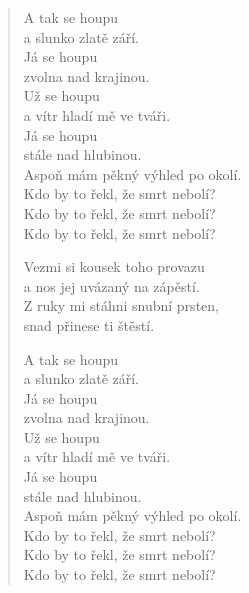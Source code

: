 \begin{multicols}{3}
\begin{verse}
A tak se houpu\\
a slunko zlatě září.\\
Já se houpu\\
zvolna nad krajinou.\\
Už se houpu\\
a vítr hladí mě ve tváři.\\
Já se houpu\\
stále nad hlubinou.\\
Aspoň mám pěkný výhled po okolí.\\
Kdo by to řekl, že smrt nebolí?\\
Kdo by to řekl, že smrt nebolí?\\
Kdo by to řekl, že smrt nebolí?

Vezmi si kousek toho provazu\\
a nos jej uvázaný na zápěstí.\\
Z ruky mi stáhni snubní prsten,\\
snad přinese ti štěstí.

A tak se houpu\\
a slunko zlatě září.\\
Já se houpu\\
zvolna nad krajinou.\\
Už se houpu\\
a vítr hladí mě ve tváři.\\
Já se houpu\\
stále nad hlubinou.\\
Aspoň mám pěkný výhled po okolí.\\
Kdo by to řekl, že smrt nebolí?\\
Kdo by to řekl, že smrt nebolí?\\
Kdo by to řekl, že smrt nebolí?

\end{verse}


\end{multicols}
